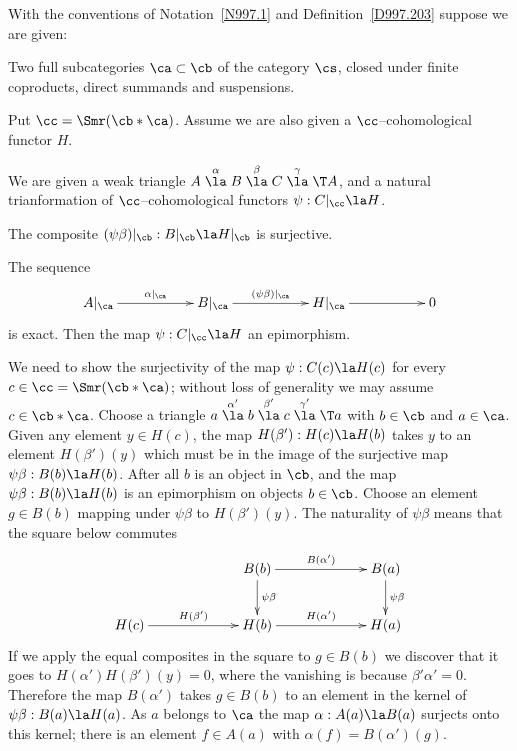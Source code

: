 \documentclass[11pt]{amsart}
\begin{document}
With the conventions of Notation~\ref{N997.1}
and Definition~\ref{D997.203}
suppose we are given:
\be
\item
Two full subcategories $\ca\subset\cb$ of the category $\cs$, closed under
finite coproducts, direct summands and
suspensions.
\item
Put $\cc=\Smr(\cb*\ca)$. Assume
we are also given a $\cc$--cohomological functor
$H$.
\item
We are given a weak triangle 
$A\stackrel{\alpha}\la B\stackrel{\beta}\la C\stackrel{\gamma}\la \T A$,
and a natural trianformation of $\cc$--cohomological functors
$\psi:C|_\cc\la H$.
\item
The composite $(\psi\beta)|_\cb:B|_\cb\la H|_\cb$ is surjective.
\item
The sequence
\[\xymatrix@C+30pt{
A|_\ca\ar[r]^-{\alpha|_\ca} & B|_\ca\ar[r]^-{(\psi\beta)|_\ca} & H|_\ca\ar[r] &0
}\]
is exact.
\ee
Then the map $\psi:C|_\cc\la H$ 
an epimorphism.
\elem


\prf
We need to show the surjectivity of the map $\psi:C(c)\la H(c)$ for every
$c\in\cc=\Smr(\cb*\ca)$; without loss of generality we may assume
$c\in\cb*\ca$.
Choose a triangle
$a\stackrel{\alpha'}\la b\stackrel{\beta'}\la c\stackrel{\gamma'}\la \T a$
with $b\in\cb$ and $a\in\ca$. Given any element $y\in H(c)$,
the map $H(\beta'):H(c)\la H(b)$ takes $y$ to an element $H(\beta')(y)$
which must be in the image of the surjective map $\psi\beta:B(b)\la H(b)$.
After all $b$ is an object in $\cb$, and the map
$\psi\beta:B(b)\la H(b)$ is an epimorphism on objects $b\in\cb$.
Choose an element $g\in B(b)$ mapping under $\psi\beta$ to $H(\beta')(y)$.
The naturality of $\psi\beta$ means that the square below commutes
\[\xymatrix@C+40pt{
  & B(b)\ar[r]^-{B(\alpha')}\ar[d]^{\psi\beta}
  & B(a) \ar[d]^{\psi\beta} \\
  H(c) \ar[r]^-{H(\beta')} & H(b) \ar[r]^-{H(\alpha')} & H(a)
}\]
If we apply the equal composites in the square to $g\in B(b)$ we discover
that it goes to $H(\alpha')H(\beta')(y)=0$, where the vanishing
is because $\beta'\alpha'=0$.
Therefore the map $B(\alpha')$ takes $g\in B(b)$
to an element in the kernel of $\psi\beta: B(a)\la H(a)$.
As $a$ belongs to $\ca$ the map
$\alpha:A(a)\la B(a)$ surjects onto
this kernel; there is an element $f\in A(a)$ with
$\alpha(f)=B(\alpha')(g)$.
\end{document}
